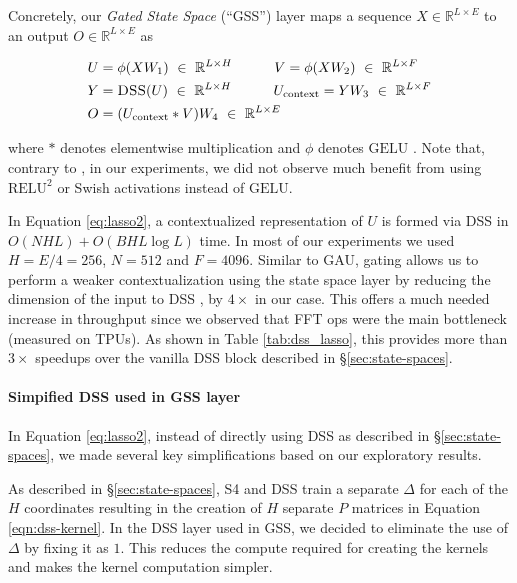 Concretely, our \textit{Gated State Space} (``GSS'') layer maps a sequence $X \in \mathbb{R}^{L \times E}$ to an output $O \in \mathbb{R}^{L \times E}$ as

\begin{align}
U &= \phi(XW_1) \ \in\ \mathbb{R}^{L \times H} \qquad \quad V = \phi(XW_2) \ \in \ \mathbb{R}^{L \times F} 
\label{eq:lasso1} \\
Y &= \textsc{DSS} (U) \ \in \ \mathbb{R}^{L \times H} \qquad \quad U_\mathrm{context} = YW_3 \ \in \ \mathbb{R}^{L \times F} 
\label{eq:lasso2} \\
O &= (U_\mathrm{context} * V)W_4 \ \in \ \mathbb{R}^{L \times E} 
\label{eq:lasso3}
\end{align}

where $*$ denotes elementwise multiplication and $\phi$ denotes $\mathrm{GELU}$ \citep{Hendrycks2016BridgingNA}. Note that, contrary to \cite{flash_hua2022transformer}, in our experiments, we did not observe much benefit from using $\mathrm{RELU}^2$ or Swish activations instead of $\mathrm{GELU}$.

In Equation \ref{eq:lasso2}, a contextualized representation of $U$ is formed via \textsc{DSS}  in $O(NHL) + O(BHL\log L)$ time. In most of our experiments we used $H=E/4=256$, $N=512$ and $F=4096$. Similar to GAU, gating allows us to perform a weaker contextualization using the state space layer by reducing the dimension of the input to \textsc{DSS} , by $4\times$ in our case. This offers a much needed increase in throughput since we observed that FFT ops were the main bottleneck (measured on TPUs). As shown in Table \ref{tab:dss_lasso}, this provides more than $3\times$ speedups over the vanilla \textsc{DSS}  block described in \S\ref{sec:state-spaces}.

\paragraph{Simpified DSS used in GSS layer} In Equation \ref{eq:lasso2}, instead of directly using \textsc{DSS}  as described in \S\ref{sec:state-spaces}, we made several key simplifications based on our exploratory results. 

As described in \S\ref{sec:state-spaces}, S4 and \textsc{DSS}  train a separate $\Delta$ for each of the $H$ coordinates resulting in the creation of $H$ separate $P$ matrices in Equation \ref{eqn:dss-kernel}. In the \textsc{DSS}  layer used in GSS, we decided to eliminate the use of $\Delta$ by fixing it as $1$. This reduces the compute required for creating the kernels and makes the kernel computation simpler. 

